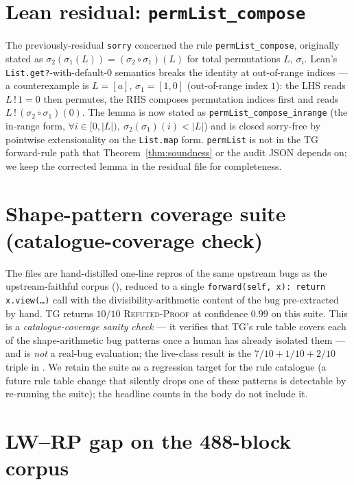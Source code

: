 \section{Lean residual: \texttt{permList\_compose}}
\label{app:lean-residual}
The previously-residual \texttt{sorry} concerned the rule
\texttt{permList\_compose}, originally stated as
$\sigma_2(\sigma_1(L))=(\sigma_2\circ\sigma_1)(L)$ for total
permutations $L$, $\sigma_i$. Lean's
\texttt{List.get?}-with-default-$0$ semantics breaks the
identity at out-of-range indices --- a counterexample is
$L{=}[a]$, $\sigma_1{=}[1,0]$ (out-of-range index $1$):
the LHS reads $L\,!\,1{=}0$ then permutes, the RHS composes
permutation indices first and reads $L\,!\,(\sigma_2\circ\sigma_1)(0)$.
The lemma is now stated as
\texttt{permList\_compose\_inrange} (the in-range form,
$\forall i\in[0,|L|),~\sigma_2(\sigma_1)(i)<|L|$) and is closed
sorry-free by pointwise extensionality on the
\texttt{List.map} form. \texttt{permList} is not in the
\textsc{TG} forward-rule path that Theorem~\ref{thm:soundness}
or the audit JSON depends on; we keep the corrected lemma in the residual file for completeness.

\section{Shape-pattern coverage suite (catalogue-coverage check)}
\label{app:catalogue-coverage}

The files are
hand-distilled one-line repros of the same upstream bugs as the
upstream-faithful corpus (), reduced to a
single
\texttt{forward(self, x): return x.view(\ldots)} call with the
divisibility-arithmetic content of the bug pre-extracted by hand.
\textsc{TG} returns $10/10$ \textsc{Refuted-Proof} at confidence
$0.99$ on this suite. This is a \emph{catalogue-coverage sanity
check} --- it verifies that TG's rule table covers each of the
shape-arithmetic bug patterns once a human has already isolated
them --- and is \emph{not} a real-bug evaluation; the live-class
result is the $7/10 + 1/10 + 2/10$ triple in . We retain the suite as a regression
target for the rule catalogue (a future rule table change that
silently drops one of these patterns is detectable by re-running
the suite); the headline counts in the body do not include it.

\section{LW--RP gap on the 488-block corpus}
\label{app:lw-rp-gap}

